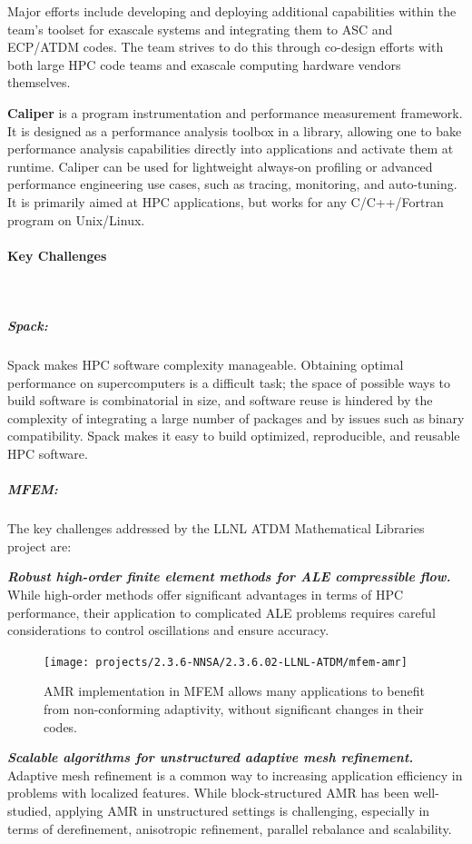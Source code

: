Major efforts include developing and deploying additional capabilities
within the team’s toolset for exascale systems and integrating them to
ASC and ECP/ATDM codes. The team strives to do this through co-design
efforts with both large HPC code teams and exascale computing hardware
vendors themselves.

\textbf{Caliper} is a program instrumentation and performance measurement
framework. It is designed as a performance analysis toolbox in a library,
allowing one to bake performance analysis capabilities directly into
applications and activate them at runtime. Caliper can be used for
lightweight always-on profiling or advanced performance engineering use
cases, such as tracing, monitoring, and auto-tuning. It is primarily
aimed at HPC applications, but works for any C/C++/Fortran program on
Unix/Linux.


\paragraph{Key  Challenges} \leavevmode \\

\subparagraph{Spack:}
Spack makes HPC software complexity manageable. Obtaining optimal
performance on supercomputers is a difficult task; the space of possible
ways to build software is combinatorial in size, and software reuse is
hindered by the complexity of integrating a large number of packages and
by issues such as binary compatibility.  Spack makes it easy to build
optimized, reproducible, and reusable HPC software.

\subparagraph{MFEM:}
The key challenges addressed by the LLNL ATDM Mathematical Libraries project are:

\noindent
{\bf \em Robust high-order finite element methods for ALE compressible flow.}
While high-order methods offer significant advantages in terms of HPC performance,
their application to complicated ALE problems requires careful considerations to
control oscillations and ensure accuracy.

\begin{figure}[htb]
\centering
\texttt{[image: projects/2.3.6-NNSA/2.3.6.02-LLNL-ATDM/mfem-amr]}
\caption{\label{fig:mfem-amr}AMR implementation in MFEM allows many applications to benefit
from non-conforming adaptivity, without significant changes in their codes.}
\end{figure}

\noindent
{\bf \em Scalable algorithms for unstructured adaptive mesh refinement.}
Adaptive mesh refinement is a common way to increasing application efficiency
in problems with localized features. While block-structured AMR has been
well-studied, applying AMR in unstructured settings is challenging, especially
in terms of derefinement, anisotropic refinement, parallel rebalance and
scalability.


